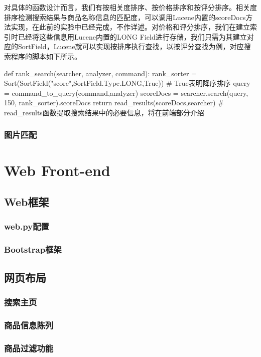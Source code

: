 对具体的函数设计而言，我们有按相关度排序、按价格排序和按评分排序。相关度排序检测搜索结果与商品名称信息的匹配度，可以调用Lucene内置的scoreDocs方法实现，在此前的实验中已经完成，不作详述。对价格和评分排序，我们在建立索引时已经将这些信息用Lucene内置的LONG Field进行存储，我们只需为其建立对应的SortField，Lucene就可以实现按排序执行查找，以按评分查找为例，对应搜索程序的脚本如下所示。

\begin{python}
def rank_search(searcher, analyzer, command):
    rank_sorter = Sort(SortField("score",SortField.Type.LONG,True))  # True表明降序排序
    query = command_to_query(command,analyzer)
    scoreDocs = searcher.search(query, 150, rank_sorter).scoreDocs
    return read_results(scoreDocs,searcher) 
    # read_results函数提取搜索结果中的必要信息，将在前端部分介绍
\end{python}

\section{图片匹配}


\part{Web Front-end}

\chapter{Web框架}

\section{web.py配置}

\section{Bootstrap框架}


\chapter{网页布局}

\section{搜索主页}

\section{商品信息陈列}

\section{商品过滤功能}
